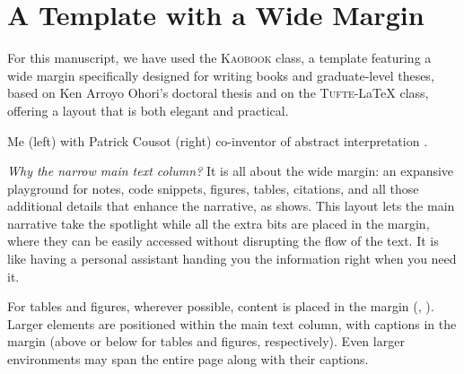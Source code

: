 \def\customcitkey{}\def\absintkey{}


\chapter*{A Template with a Wide Margin}

For this manuscript, we have used the \textsc{Kaobook} class, a template featuring a wide margin specifically designed for writing books and graduate-level theses, based on Ken Arroyo Ohori's doctoral thesis and on the \textsc{Tufte}-\LaTeX{} class, offering a layout that is both elegant and practical.

\newcommand*{\ClipSep}{0.5cm}
\begin{marginfigure}
  \centering
  \hspace*{-\ClipSep}
    \vspace*{-\ClipSep}
  \caption{Me (left) with Patrick Cousot (right) co-inventor of abstract interpretation \cite{\absintkey}.}
\end{marginfigure}

\emph{Why the narrow main text column?} It is all about the wide margin: an expansive playground for notes, code snippets, figures, tables, citations, and all those additional details that enhance the narrative, as  shows.
This layout lets the main narrative take the spotlight while all the extra bits are placed in the margin, where they can be easily accessed without disrupting the flow of the text. It is like having a personal assistant handing you the information right when you need it.


For tables and figures, wherever possible, content is placed in the margin (\eg, ). Larger elements are positioned within the main text column, with captions in the margin (above or below for tables and figures, respectively). Even larger environments may span the entire page along with their captions.



